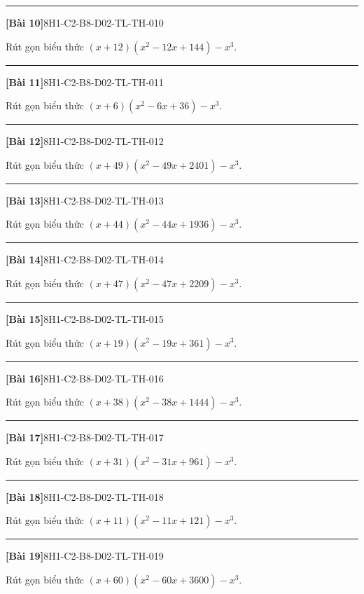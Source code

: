 \documentclass[12pt,a4paper]{article}
\newif\ifloigiai
\newenvironment{cauhoi}[2]{%
  \par\medskip\noindent\rule{\textwidth}{0.4pt}\par\nopagebreak
  \noindent\textbf{[#1]}\hfill{\scriptsize\ttfamily #2}\par\nopagebreak\smallskip}{\par}
\newcommand{\loigiai}[1]{\ifloigiai\par\smallskip\noindent\textit{Lời giải.} #1\par\fi}
\begin{document}
\begin{cauhoi}{Bài 10}{8H1-C2-B8-D02-TL-TH-010}
Rút gọn biểu thức $(x+12)(x^{2}-12x+144)-x^{3}$.
\loigiai{Ta có $(x+12)(x^{2}-12x+144)=x^{3}+1728$ nên biểu thức bằng $x^{3}+1728-x^{3}=1728$.}
\end{cauhoi}
\begin{cauhoi}{Bài 11}{8H1-C2-B8-D02-TL-TH-011}
Rút gọn biểu thức $(x+6)(x^{2}-6x+36)-x^{3}$.
\loigiai{Ta có $(x+6)(x^{2}-6x+36)=x^{3}+216$ nên biểu thức bằng $x^{3}+216-x^{3}=216$.}
\end{cauhoi}
\begin{cauhoi}{Bài 12}{8H1-C2-B8-D02-TL-TH-012}
Rút gọn biểu thức $(x+49)(x^{2}-49x+2401)-x^{3}$.
\loigiai{Ta có $(x+49)(x^{2}-49x+2401)=x^{3}+117649$ nên biểu thức bằng $x^{3}+117649-x^{3}=117649$.}
\end{cauhoi}
\begin{cauhoi}{Bài 13}{8H1-C2-B8-D02-TL-TH-013}
Rút gọn biểu thức $(x+44)(x^{2}-44x+1936)-x^{3}$.
\loigiai{Ta có $(x+44)(x^{2}-44x+1936)=x^{3}+85184$ nên biểu thức bằng $x^{3}+85184-x^{3}=85184$.}
\end{cauhoi}
\begin{cauhoi}{Bài 14}{8H1-C2-B8-D02-TL-TH-014}
Rút gọn biểu thức $(x+47)(x^{2}-47x+2209)-x^{3}$.
\loigiai{Ta có $(x+47)(x^{2}-47x+2209)=x^{3}+103823$ nên biểu thức bằng $x^{3}+103823-x^{3}=103823$.}
\end{cauhoi}
\begin{cauhoi}{Bài 15}{8H1-C2-B8-D02-TL-TH-015}
Rút gọn biểu thức $(x+19)(x^{2}-19x+361)-x^{3}$.
\loigiai{Ta có $(x+19)(x^{2}-19x+361)=x^{3}+6859$ nên biểu thức bằng $x^{3}+6859-x^{3}=6859$.}
\end{cauhoi}
\begin{cauhoi}{Bài 16}{8H1-C2-B8-D02-TL-TH-016}
Rút gọn biểu thức $(x+38)(x^{2}-38x+1444)-x^{3}$.
\loigiai{Ta có $(x+38)(x^{2}-38x+1444)=x^{3}+54872$ nên biểu thức bằng $x^{3}+54872-x^{3}=54872$.}
\end{cauhoi}
\begin{cauhoi}{Bài 17}{8H1-C2-B8-D02-TL-TH-017}
Rút gọn biểu thức $(x+31)(x^{2}-31x+961)-x^{3}$.
\loigiai{Ta có $(x+31)(x^{2}-31x+961)=x^{3}+29791$ nên biểu thức bằng $x^{3}+29791-x^{3}=29791$.}
\end{cauhoi}
\begin{cauhoi}{Bài 18}{8H1-C2-B8-D02-TL-TH-018}
Rút gọn biểu thức $(x+11)(x^{2}-11x+121)-x^{3}$.
\loigiai{Ta có $(x+11)(x^{2}-11x+121)=x^{3}+1331$ nên biểu thức bằng $x^{3}+1331-x^{3}=1331$.}
\end{cauhoi}
\begin{cauhoi}{Bài 19}{8H1-C2-B8-D02-TL-TH-019}
Rút gọn biểu thức $(x+60)(x^{2}-60x+3600)-x^{3}$.
\loigiai{Ta có $(x+60)(x^{2}-60x+3600)=x^{3}+216000$ nên biểu thức bằng $x^{3}+216000-x^{3}=216000$.}
\end{cauhoi}
\end{document}

